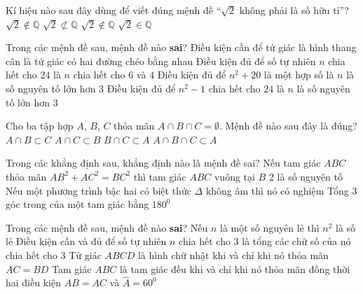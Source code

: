 \begin{ex}%
	Kí hiệu nào sau đây dùng để viết đúng mệnh đề ``$\sqrt{2}$ không phải là  số hữu tỉ''?
	\choice 
		 {$\sqrt{2}\notin \mathbb{Q}$}
		 {$\sqrt{2}\not\subset\mathbb{Q}$}
		{\True $\sqrt{2}\notin\mathbb{Q}$} 
		 {$\sqrt{2}\in\mathbb{Q}$}
\end{ex}

\begin{ex}%
	Trong các mệnh đề sau, mệnh đề nào  \textbf{sai}?
	 \choice
		 {Điều kiện cần để tứ giác là hình thang cân là tứ giác có hai đường chéo bằng nhau}
		{\True Điều kiện đủ để số tự nhiên $n$ chia hết cho $24$ là $n$  chia hết cho $6$ và $4$}
		{Điều kiện đủ để $n^2+20$ là một hợp số là $n$  là số nguyên tố lớn hơn $3$}
		{Điều kiện đủ để $n^2-1$ chia hết cho $24$ là $n$ là số nguyên tố lớn hơn $3$} 
\end{ex}

\begin{ex}%
	Cho ba tập hợp $A$, $B$, $C$ thỏa mãn $A\cap B\cap  C=\emptyset$. Mệnh đề nào sau đây là đúng?
	 \choice
		{$A\cap B\subset  C$}
		{$A\cap C\subset B$} 
		{$B\cap C\subset  A$}
		{\True $A\cap B\cap C\subset A$} 
\end{ex}

\begin{ex}%
	Trong các khẳng định  sau, khẳng định nào là mệnh đề sai?
	 \choice
		{\True Nếu tam giác $ABC$ thỏa mãn $AB^2+AC^2=BC^2$ thì tam giác  $ABC$ vuông tại $B$}
		{2 là số nguyên tố} 
		{Nếu một phương trình bậc hai có biệt thức $\Delta$ không  âm thì nó có nghiệm}
		{Tổng $3$ góc  trong của một tam giác bằng $180^0$}
\end{ex}

\begin{ex}%
	Trong  các mệnh đề sau, mệnh đề nào \textbf{sai}?
	\choice 
		 {Nếu $n$ là một số nguyên lẻ thì $n^2$ là số lẻ}
		{Điều kiện cần và đủ để số tự nhiên $n$ chia hết cho  3 là tổng các chữ số của nó chia hết cho $3$}
		{\True Tứ giác  $ABCD$ là hình chữ nhật khi và chỉ khi nó thỏa mãn $AC=BD$}
		{Tam  giác $ABC$ là tam giác đều khi và chỉ khi nó thỏa mãn đồng thời hai điều kiện $AB=AC$ và $\widehat{A}=60^0$}
\end{ex}

